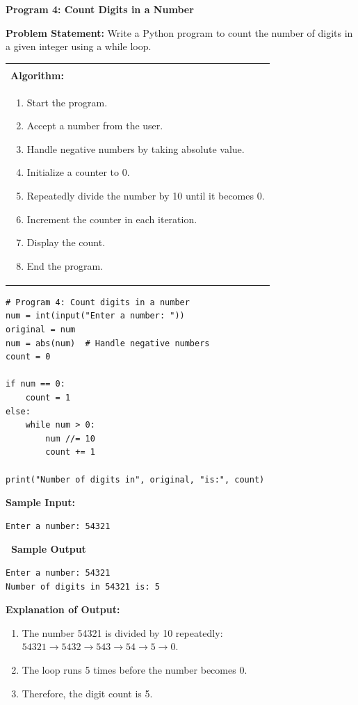 \documentclass[12pt,a4paper]{article}
\makeatletter
\newcommand{\outhead}{\noindent\colorbox{cmrgreen!25}%
  {\textbf{\small\color{cmrdark}~Sample Output~}}\par\vspace{-1pt}}
\newenvironment{algobox}{%
  \par\vspace{4pt}%
  \noindent\begin{tabular}{@{}p{\linewidth}@{}}%
  \hline\\[-8pt]%
  \textbf{\color{blue!60!black}\small Algorithm:}\\[2pt]%
}{%
  \\[-4pt]\hline%
  \end{tabular}\par\vspace{4pt}%
}
\makeatother
\begin{document}
\textbf{Program 4: Count Digits in a Number}

\textbf{Problem Statement:}
Write a Python program to count the number of digits in a given integer using a while loop.

\begin{algobox}
\begin{enumerate}[label=Step \arabic*:]
  \item Start the program.
  \item Accept a number from the user.
  \item Handle negative numbers by taking absolute value.
  \item Initialize a counter to 0.
  \item Repeatedly divide the number by 10 until it becomes 0.
  \item Increment the counter in each iteration.
  \item Display the count.
  \item End the program.
\end{enumerate}
\end{algobox}

\begin{lstlisting}
# Program 4: Count digits in a number
num = int(input("Enter a number: "))
original = num
num = abs(num)  # Handle negative numbers
count = 0

if num == 0:
    count = 1
else:
    while num > 0:
        num //= 10
        count += 1

print("Number of digits in", original, "is:", count)
\end{lstlisting}

\textbf{Sample Input:}
\begin{verbatim}
Enter a number: 54321
\end{verbatim}

\outhead
\begin{lstlisting}[style=outputstyle]
Enter a number: 54321
Number of digits in 54321 is: 5
\end{lstlisting}

\textbf{Explanation of Output:}
\begin{enumerate}
  \item The number 54321 is divided by 10 repeatedly: $54321 \to 5432 \to 543 \to 54 \to 5 \to 0$.
  \item The loop runs 5 times before the number becomes 0.
  \item Therefore, the digit count is 5.
\end{enumerate}
\end{document}
